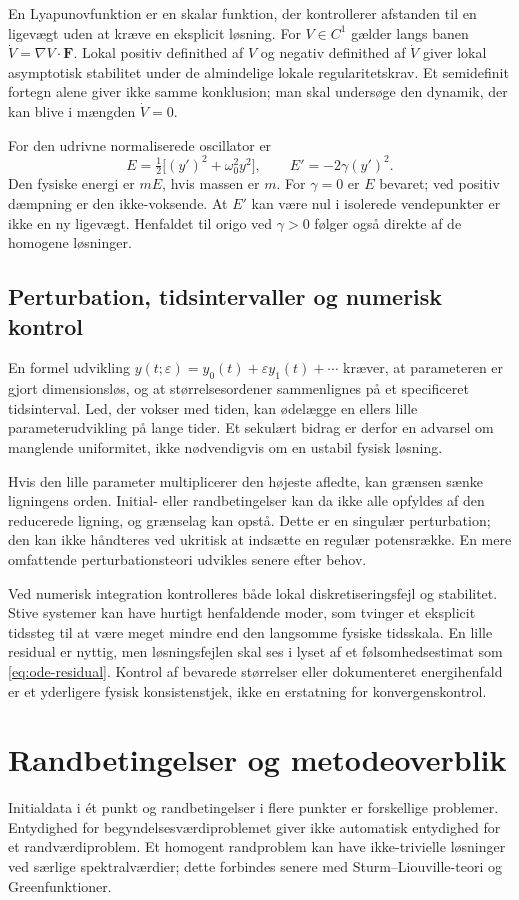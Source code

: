 En Lyapunovfunktion er en skalar funktion, der kontrollerer afstanden
til en ligevægt uden at kræve en eksplicit løsning. For $V\in C^1$
gælder langs banen
$\dot V=\nabla V\cdot\boldsymbol{F}$. Lokal positiv definithed af $V$
og negativ definithed af $\dot V$ giver lokal asymptotisk stabilitet
under de almindelige lokale regularitetskrav. Et semidefinit fortegn
alene giver ikke samme konklusion; man skal undersøge den dynamik,
der kan blive i mængden $\dot V=0$.

For den udrivne normaliserede oscillator er
\[
 E=\tfrac12\bigl[(y')^2+\omega_0^2y^2\bigr],\qquad
 E'=-2\gamma(y')^2.
\]
Den fysiske energi er $mE$, hvis massen er $m$. For $\gamma=0$ er
$E$ bevaret; ved positiv dæmpning er den ikke-voksende. At $E'$ kan
være nul i isolerede vendepunkter er ikke en ny ligevægt. Henfaldet
til origo ved $\gamma>0$ følger også direkte af de homogene løsninger.

\subsection{Perturbation, tidsintervaller og numerisk kontrol}
En formel udvikling
$y(t;\varepsilon)=y_0(t)+\varepsilon y_1(t)+\cdots$ kræver, at parameteren
er gjort dimensionsløs, og at størrelsesordener sammenlignes på et
specificeret tidsinterval. Led, der vokser med tiden, kan ødelægge en
ellers lille parameterudvikling på lange tider. Et sekulært bidrag er
derfor en advarsel om manglende uniformitet, ikke nødvendigvis om en
ustabil fysisk løsning.

Hvis den lille parameter multiplicerer den højeste afledte, kan grænsen
sænke ligningens orden. Initial- eller randbetingelser kan da ikke alle
opfyldes af den reducerede ligning, og grænselag kan opstå. Dette er en
singulær perturbation; den kan ikke håndteres ved ukritisk at indsætte
en regulær potensrække. En mere omfattende perturbationsteori udvikles
senere efter behov.

Ved numerisk integration kontrolleres både lokal diskretiseringsfejl og
stabilitet. Stive systemer kan have hurtigt henfaldende moder, som tvinger
et eksplicit tidssteg til at være meget mindre end den langsomme fysiske
tidsskala. En lille residual er nyttig, men løsningsfejlen skal ses i
lyset af et følsomhedsestimat som \eqref{eq:ode-residual}. Kontrol af
bevarede størrelser eller dokumenteret energihenfald er et yderligere
fysisk konsistenstjek, ikke en erstatning for konvergenskontrol.

\section{Randbetingelser og metodeoverblik}
Initialdata i ét punkt og randbetingelser i flere punkter er forskellige
problemer. Entydighed for begyndelsesværdiproblemet giver ikke automatisk
entydighed for et randværdiproblem. Et homogent randproblem kan have
ikke-trivielle løsninger ved særlige spektralværdier; dette forbindes
senere med Sturm--Liouville-teori og Greenfunktioner.

